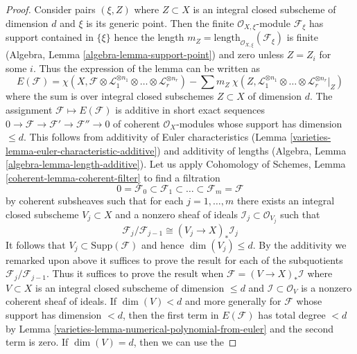 \begin{proof}

Consider pairs $(\xi , Z)$ where $Z \subset X$ is an integral
closed subscheme of dimension $d$ and $\xi$ is its generic point.
Then the finite $\mathcal{O}_{X, \xi}$-module $\mathcal{F}_\xi$
has support contained in $\{\xi\}$ hence the length
$m_Z = \text{length}_{\mathcal{O}_{X, \xi}}(\mathcal{F}_\xi)$
is finite (Algebra, Lemma \ref{algebra-lemma-support-point})
and zero unless $Z = Z_i$ for some $i$. Thus the expression
of the lemma can be written as
$$
E(\mathcal{F}) =
\chi(X, \mathcal{F} \otimes \mathcal{L}_1^{\otimes n_1} \otimes \ldots \otimes
\mathcal{L}_r^{\otimes n_r}) -
\sum\nolimits
m_Z\ \chi(Z, \mathcal{L}_1^{\otimes n_1} \otimes \ldots \otimes
\mathcal{L}_r^{\otimes n_r}|_Z)
$$
where the sum is over integral closed subschemes $Z \subset X$
of dimension $d$. The assignment $\mathcal{F} \mapsto E(\mathcal{F})$
is additive in short exact sequences
$0 \to \mathcal{F} \to \mathcal{F}' \to \mathcal{F}'' \to 0$
of coherent $\mathcal{O}_X$-modules whose support has dimension
$\leq d$. This follows from additivity of Euler characteristics
(Lemma \ref{varieties-lemma-euler-characteristic-additive})
and additivity of lengths
(Algebra, Lemma \ref{algebra-lemma-length-additive}).
Let us apply Cohomology of Schemes, Lemma \ref{coherent-lemma-coherent-filter}
to find a filtration
$$
0 = \mathcal{F}_0 \subset \mathcal{F}_1 \subset
\ldots \subset \mathcal{F}_m = \mathcal{F}
$$
by coherent subsheaves such that for each $j = 1, \ldots, m$
there exists an integral closed subscheme $V_j \subset X$
and a nonzero sheaf of ideals $\mathcal{I}_j \subset \mathcal{O}_{V_j}$
such that
$$
\mathcal{F}_j/\mathcal{F}_{j - 1}
\cong (V_j \to X)_* \mathcal{I}_j
$$
It follows that $V_j \subset \text{Supp}(\mathcal{F})$ and
hence $\dim(V_j) \leq d$.
By the additivity we remarked upon above it suffices to
prove the result for each of the subquotients
$\mathcal{F}_j/\mathcal{F}_{j - 1}$. Thus it suffices to prove
the result when $\mathcal{F} = (V \to X)_*\mathcal{I}$ where
$V \subset X$ is an integral closed subscheme of dimension $\leq d$
and $\mathcal{I} \subset \mathcal{O}_V$ is a nonzero coherent
sheaf of ideals. If $\dim(V) < d$ and more generally for $\mathcal{F}$
whose support has dimension $< d$, then the first term
in $E(\mathcal{F})$ has total degree $< d$ by
Lemma \ref{varieties-lemma-numerical-polynomial-from-euler}
and the second term is zero. If $\dim(V) = d$, then we can use the

\end{proof}
